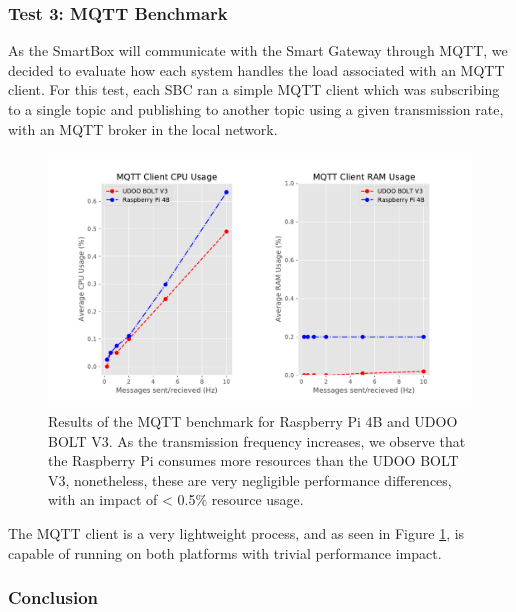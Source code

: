 

\subsubsection{Test 3: \acs{MQTT} Benchmark}

As the SmartBox will communicate with the Smart Gateway through \acs{MQTT}, we decided to evaluate how each system handles the load associated with an \acs{MQTT} client. For this test, each \acs{SBC} ran a simple \acs{MQTT} client which was subscribing to a single topic and publishing to another topic using a given transmission rate, with an \acs{MQTT} broker in the local network.

\begin{figure}[H]
    \centering
    \includegraphics[width=\linewidth]{images/mqtt_test_results.pdf}
    \caption[Results of the \acs{MQTT} benchmark for Raspberry Pi 4B and UDOO BOLT V3.]{Results of the \acs{MQTT} benchmark for Raspberry Pi 4B and UDOO BOLT V3. As the transmission frequency increases, we observe that the Raspberry Pi consumes more resources than the UDOO BOLT V3, nonetheless, these are very negligible performance differences, with an impact of < 0.5\% resource usage.}
    \label{fig:mqtt-tests}
\end{figure}

The \acs{MQTT} client is a very lightweight process, and as seen in Figure \ref{fig:mqtt-tests}, is capable of running on both platforms with trivial performance impact.

\subsubsection{Conclusion}

